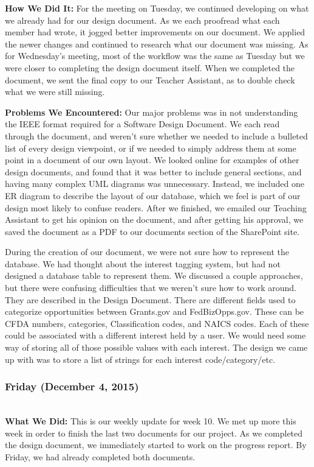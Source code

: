 \documentclass[onecolumn]{IEEEtran}
\begin{document}
    \textbf{How We Did It: } 
    For the meeting on Tuesday, we continued developing on what we already had for our design document. As we each proofread what each member had wrote, it jogged better improvements on our document. We applied the newer changes and continued to research what our document was missing. As for Wednesday's meeting, most of the workflow was the same as Tuesday but we were closer to completing the design document itself. When we completed the document, we sent the final copy to our Teacher Assistant, as to double check what we were still missing.  
    
    \textbf{Problems We Encountered: } 
    Our major problems was in not understanding the IEEE format required for a Software Design Document. We each read through the document, and weren't sure whether we needed to include a bulleted list of every design viewpoint, or if we needed to simply address them at some point in a document of our own layout. We looked online for examples of other design documents, and found that it was better to include general sections, and having many complex UML diagrams was unnecessary. Instead, we included one ER diagram to describe the layout of our database, which we feel is part of our design most likely to confuse readers. After we finished, we emailed our Teaching Assistant to get his opinion on the document, and after getting his approval, we saved the document as a PDF to our documents section of the SharePoint site.  
    
    During the creation of our document, we were not sure how to represent the database. We had thought about the interest tagging system, but had not designed a database table to represent them. We discussed a couple approaches, but there were confusing difficulties that we weren't sure how to work around. They are described in the Design Document. There are different fields used to categorize opportunities between Grants.gov and FedBizOpps.gov. These can be CFDA numbers, categories, Classification codes, and NAICS codes. Each of these could be associated with a different interest held by a user. We would need some way of storing all of those possible values with each interest. The design we came up with was to store a list of strings for each interest code/category/etc.  

\subsubsection{Friday (December 4, 2015)} \hspace*{\fill} \\  
    \textbf{What We Did: }
    This is our weekly update for week 10. We met up more this week in order to finish the last two documents for our project. As we completed the design document, we immediately started to work on the progress report. By Friday, we had already completed both documents.  
    
\end{document}
